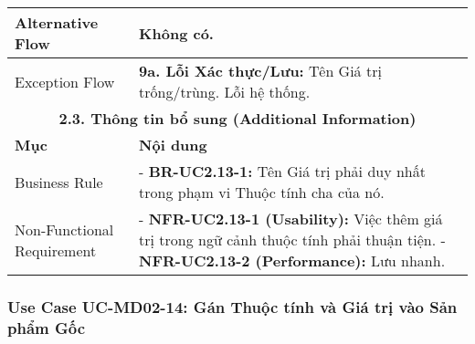 \begin{longtable}{|m{4cm}|p{11cm}|}
\hline
Alternative Flow & Không có. \\
\hline
Exception Flow & \textbf{9a. Lỗi Xác thực/Lưu:} Tên Giá trị trống/trùng. Lỗi hệ thống. \\
\hline
\multicolumn{2}{|c|}{\textbf{2.3. Thông tin bổ sung (Additional Information)}} \\
\hline
\textbf{Mục} & \textbf{Nội dung} \\
\hline
Business Rule & - \textbf{BR-UC2.13-1:} Tên Giá trị phải duy nhất trong phạm vi Thuộc tính cha của nó. \\
\hline
Non-Functional Requirement & - \textbf{NFR-UC2.13-1 (Usability):} Việc thêm giá trị trong ngữ cảnh thuộc tính phải thuận tiện. \newline - \textbf{NFR-UC2.13-2 (Performance):} Lưu nhanh. \\
\hline
\end{longtable}

\subsubsection{Use Case UC-MD02-14: Gán Thuộc tính và Giá trị vào Sản phẩm Gốc}

